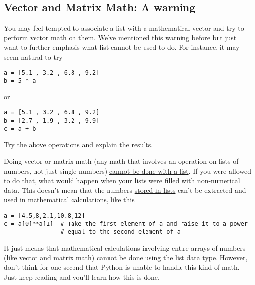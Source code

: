 \subsection*{Vector and Matrix Math: A warning}
 You may feel tempted to associate a
list with a mathematical vector and try to perform vector math on
them. We've mentioned this warning before but just want to further emphasis
what list cannot be used to do. For instance, it may seem natural to try
\begin{Verbatim}
a = [5.1 , 3.2 , 6.8 , 9.2]
b = 5 * a
\end{Verbatim}
or 
\begin{Verbatim}
a = [5.1 , 3.2 , 6.8 , 9.2]
b = [2.7 , 1.9 , 3.2 , 9.9]
c = a + b
\end{Verbatim}
\begin{enumerate}
\prob  Try the above operations and explain the results.
\end{enumerate}
Doing vector or matrix math (any math that involves an operation on
lists of numbers, not just single numbers) \underline{cannot be done
  with a list}.  If you were allowed to do that, what would happen
when your lists were filled with non-numerical data.  This doesn't
mean that the numbers \ul{stored in lists} can't be extracted and used in
mathematical calculations, like this 
\begin{Verbatim}
a = [4.5,8,2.1,10.8,12]
c = a[0]**a[1]  # Take the first element of a and raise it to a power
                # equal to the second element of a
\end{Verbatim}
It just means that mathematical calculations involving entire arrays
of numbers (like vector and matrix math) cannot be done using the list
data type.  However, don't think for one second that Python is unable
to handle this kind of math.  Just keep reading and you'll learn how
this is done.  
